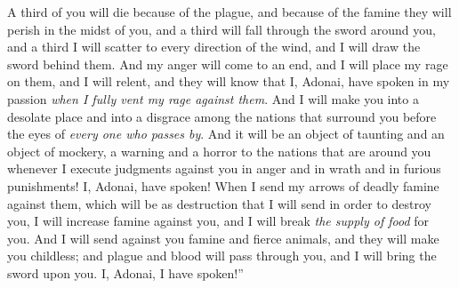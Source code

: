 \begin{biblechapter}
\verse A third of you will die because of the plague, and because of the famine they will perish in the midst of you, and a third will fall through the sword around you, and a third I will scatter to every direction of the wind, and I will draw the sword behind them.
\verse And my anger will come to an end, and I will place my rage on them, and I will relent, and they will know that I, Adonai, have spoken in my passion \textit{when I fully vent my rage against them}.
\verse And I will make you into a desolate place and into a disgrace among the nations that surround you before the eyes of \textit{every one who passes by}.
\verse And it will be an object of taunting and an object of mockery, a warning and a horror to the nations that are around you whenever I execute judgments against you in anger and in wrath and in furious punishments! I, Adonai, have spoken!
\verse When I send my arrows of deadly famine against them, which will be as destruction that I will send in order to destroy you, I will increase famine against you, and I will break \textit{the supply of food} for you.
\verse And I will send against you famine and fierce animals, and they will make you childless; and plague and blood will pass through you, and I will bring the sword upon you. I, Adonai, I have spoken!”
\end{biblechapter}

